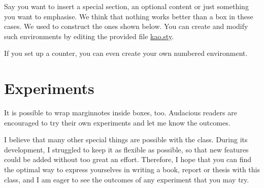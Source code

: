 Say you want to insert a special section, an optional content or just 
something you want to emphasise. We think that nothing works better than 
a box in these cases. We used  to construct the ones 
shown below. You can create and modify such environments by editing the 
provided file \href{kao.sty}{kao.sty}.

\begin{kaobox}[title=Title of the box]
\blindtext
\end{kaobox}

If you set up a counter, you can even create your own numbered 
environment.

\begin{kaocounter}
	\blindtext
\end{kaocounter}

\section{Experiments}

It is possible to wrap marginnotes inside boxes, too. Audacious readers 
are encouraged to try their own experiments and let me know the 
outcomes.


I believe that many other special things are possible with the 
 class. During its development, I struggled to keep it as 
flexible as possible, so that new features could be added without too 
great an effort. Therefore, I hope that you can find the optimal way to 
express yourselves in writing a book, report or thesis with this class, 
and I am eager to see the outcomes of any experiment that you may try.

